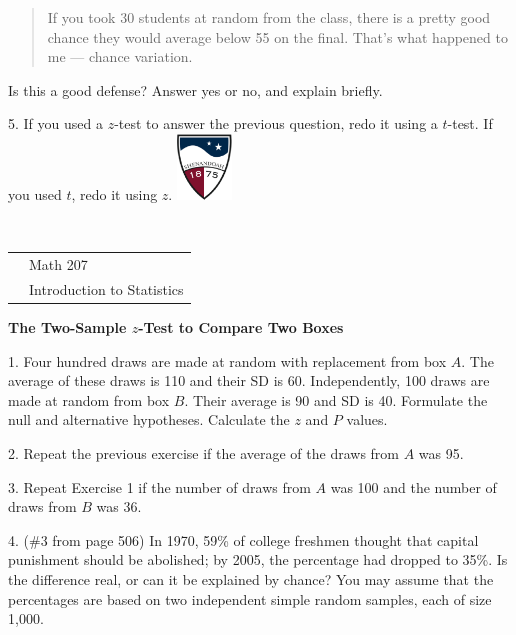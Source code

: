 \documentclass[10pt]{article}
\begin{document}
\begin{quote}
If you took 30 students at random from the class, there is a pretty good chance 
they would average
below 55 on the final.  That's what happened to me --- chance variation.
\end{quote}

Is this a good defense?  Answer yes or no, and explain briefly.
\vspace{3in}

5. If you used a $z$-test to answer the previous question, redo it using a $t$-test.
If you used $t$, redo it using $z$.
\vfill
\eject
\href{http://www.su.edu}{\includegraphics[height=1.75cm]{sulogo.eps}}
\vspace{-1.79cm}

{{\ }\hfill\small
\begin{tabular}{cl}
& Math 207\\
& Introduction to Statistics\\
\end{tabular}
}
\medskip

\begin{center}
\textbf{\large  The Two-Sample $z$-Test to Compare Two Boxes}
\end{center}
\smallskip

1. 
Four hundred draws are made at random with replacement from box $A$.  The
average of these draws is 110 and their SD is 60.
Independently, 100 draws are made at random from box $B$.  Their average is 90
and SD is 40.  Formulate the null and alternative hypotheses.  Calculate the $z$
and $P$ values.
\vspace{1.5in}


2. Repeat the previous exercise if the average of the draws from $A$ was
95.
\vspace{1.5in}

3. Repeat Exercise 1 if the number of draws from $A$ was 100 and the number
of draws from $B$ was 36.
\vspace{1.5in}

4. (\#3 from page 506)
In 1970, 59\% of college freshmen thought that capital punishment
should be abolished;  by 2005, the percentage had dropped to 35\%.
Is the difference real, or can it be explained by chance? You may assume that
the percentages are based on two independent simple random samples, each of
size 1,000.
\end{document}
